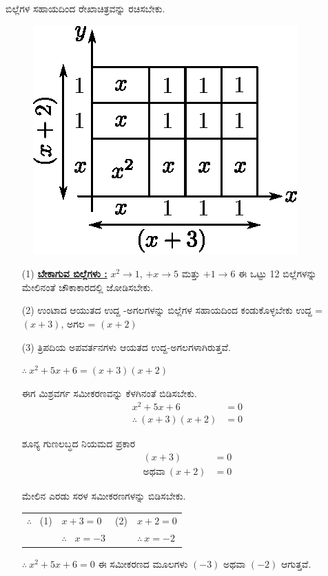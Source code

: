 ಬಿಲ್ಲೆಗಳ ಸಹಾಯದಿಂದ ರೇಖಾಚಿತ್ರವನ್ನು ರಚಿಸಬೇಕು.
\begin{figure}[H]
\centering
\includegraphics[scale=0.8]{src/figure/chap3/fig3-51.eps}
\end{figure}
\begin{itemize}
\item [(1)]{\textbf{\underline{ಬೇಕಾಗುವ ಬಿಲ್ಲೆಗಳು :}}} $x^2 \rightarrow 1$, $+x \rightarrow 5$ ಮತ್ತು $+1 \rightarrow 6$ ಈ ಒಟ್ಟು 12 ಬಿಲ್ಲೆಗಳನ್ನು ಮೇಲಿನಂತೆ ಚೌಕಾಕಾರದಲ್ಲಿ ಜೋಡಿಸಬೇಕು. 
\item [(2)] ಉಂಟಾದ ಆಯುತದ ಉದ್ದ -ಅಗಲಗಳನ್ನು ಬಿಲ್ಲೆಗಳ ಸಹಾಯದಿಂದ ಕಂಡುಕೊಳ್ಳ\break ಬೇಕು ಉದ್ದ = $(x + 3)$, ಅಗಲ = $(x+2)$
\item [(3)] ತ್ರಿಪದಿಯ ಅಪವರ್ತನಗಳು ಆಯತದ ಉದ್ದ-ಅಗಲಗಳಾಗಿರುತ್ತವೆ. 

$\therefore~ x^2 + 5x + 6 = (x+3)(x+2)$

ಈಗ ಮಿಶ್ರವರ್ಗ ಸಮೀಕರಣವನ್ನು ಕೆಳಗಿನಂತೆ ಬಿಡಿಸಬೇಕು.
\begin{align*}
x^2 + 5x + 6 & = 0\\
\therefore~ (x+3)(x+2) & = 0
\end{align*}

ಶೂನ್ಯ ಗುಣಲಬ್ಧದ ನಿಯಮದ ಪ್ರಕಾರ
\begin{align*}
(x + 3) & = 0\tag{1}\\
\text{ಅಥವಾ}~ (x + 2) & = 0\tag{2}
\end{align*}

ಮೇಲಿನ ಎರಡು ಸರಳ ಸಮೀಕರಣಗಳನ್ನು ಬಿಡಿಸಬೇಕು.

\begin{tabular}{llll}
$\therefore$~ (1) & $x + 3 = 0$ & (2) & $x+2 = 0$\\
& $\therefore$~ $x = -3$ & &$\therefore~ x = -2$
\end{tabular}

$\therefore~ x^2 + 5x + 6 = 0$ ಈ ಸಮೀಕರಣದ ಮೂಲಗಳು $(-3)$ ಅಥವಾ $(-2)$ ಆಗುತ್ತವೆ. 
\end{itemize}

